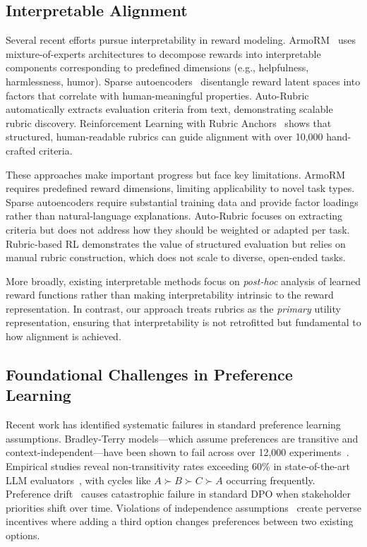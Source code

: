 \documentclass[sigconf]{acmart}
\begin{document}
\subsection{Interpretable Alignment}

Several recent efforts pursue interpretability in reward modeling. ArmoRM~\cite{armorm2024} uses mixture-of-experts architectures to decompose rewards into interpretable components corresponding to predefined dimensions (e.g., helpfulness, harmlessness, humor). Sparse autoencoders~\cite{sparse_rm2025} disentangle reward latent spaces into factors that correlate with human-meaningful properties. Auto-Rubric~\cite{autorubric2025} automatically extracts evaluation criteria from text, demonstrating scalable rubric discovery. Reinforcement Learning with Rubric Anchors~\cite{rubric_rl2025} shows that structured, human-readable rubrics can guide alignment with over 10,000 hand-crafted criteria.

These approaches make important progress but face key limitations. ArmoRM requires predefined reward dimensions, limiting applicability to novel task types. Sparse autoencoders require substantial training data and provide factor loadings rather than natural-language explanations. Auto-Rubric focuses on extracting criteria but does not address how they should be weighted or adapted per task. Rubric-based RL demonstrates the value of structured evaluation but relies on manual rubric construction, which does not scale to diverse, open-ended tasks.

More broadly, existing interpretable methods focus on \emph{post-hoc} analysis of learned reward functions rather than making interpretability intrinsic to the reward representation. In contrast, our approach treats rubrics as the \emph{primary} utility representation, ensuring that interpretability is not retrofitted but fundamental to how alignment is achieved.


\subsection{Foundational Challenges in Preference Learning}

Recent work has identified systematic failures in standard preference learning assumptions. Bradley-Terry models—which assume preferences are transitive and context-independent—have been shown to fail across over 12,000 experiments~\cite{bt_critique2024}. Empirical studies reveal non-transitivity rates exceeding 60\% in state-of-the-art LLM evaluators~\cite{elspr2025,nontransitivity2025}, with cycles like \(A \succ B \succ C \succ A\) occurring frequently. Preference drift~\cite{preference_drift2024} causes catastrophic failure in standard DPO when stakeholder priorities shift over time. Violations of independence assumptions~\cite{rlhf_iia2023} create perverse incentives where adding a third option changes preferences between two existing options.
\end{document}
